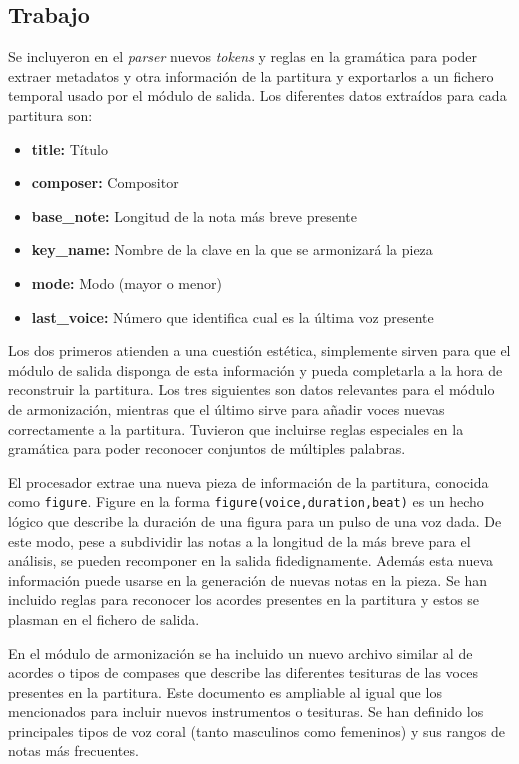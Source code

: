 \subsection{Trabajo}
\label{subsec:seventh_iteration_work}
Se incluyeron en el \textit{parser} nuevos \textit{tokens} y reglas en la gramática para poder extraer metadatos y otra información de la partitura y exportarlos a un fichero temporal usado por el módulo de salida. Los diferentes datos extraídos para cada partitura son:
\begin{itemize}
	\item \textbf{title:} Título
	\item \textbf{composer:} Compositor
	\item \textbf{base\_note:} Longitud de la nota más breve presente
	\item \textbf{key\_name:} Nombre de la clave en la que se armonizará la pieza
	\item \textbf{mode:} Modo (mayor o menor)
	\item \textbf{last\_voice:} Número que identifica cual es la última voz presente
\end{itemize}
Los dos primeros atienden a una cuestión estética, simplemente sirven para que el módulo de salida disponga de esta información y pueda completarla a la hora de reconstruir la partitura. Los tres siguientes son datos relevantes para el módulo de armonización, mientras que el último sirve para añadir voces nuevas correctamente a la partitura. Tuvieron que incluirse reglas especiales en la gramática para poder reconocer conjuntos de múltiples palabras.

El procesador extrae una nueva pieza de información de la partitura, conocida como \texttt{figure}. Figure en la forma \texttt{figure(voice,duration,beat)} es un hecho lógico que describe la duración de una figura para un pulso de una voz dada. De este modo, pese a subdividir las notas a la longitud de la más breve para el análisis, se pueden recomponer en la salida fidedignamente. Además esta nueva información puede usarse en la generación de nuevas notas en la pieza. Se han incluido reglas para reconocer los acordes presentes en la partitura y estos se plasman en el fichero de salida.

En el módulo de armonización se ha incluido un nuevo archivo similar al de acordes o tipos de compases que describe las diferentes tesituras de las voces presentes en la partitura. Este documento es ampliable al igual que los mencionados para incluir nuevos instrumentos o tesituras. Se han definido los principales tipos de voz coral (tanto masculinos como femeninos) y sus rangos de notas más frecuentes. 

